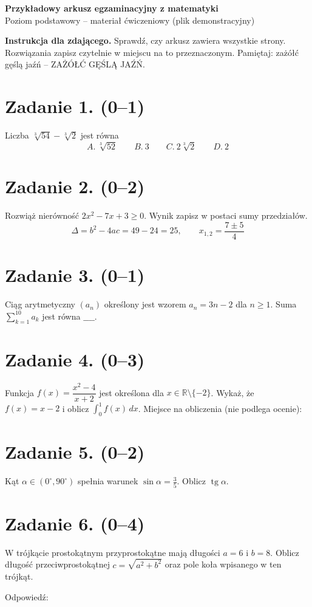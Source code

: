 \documentclass[a4paper,11pt]{article}
\begin{document}
\begin{center}
{\Large\bfseries Przykładowy arkusz egzaminacyjny z matematyki}\\[4pt]
Poziom podstawowy -- materiał ćwiczeniowy (plik demonstracyjny)
\end{center}
\noindent\textbf{Instrukcja dla zdającego.} Sprawdź, czy arkusz zawiera wszystkie strony.
Rozwiązania zapisz czytelnie w miejscu na to przeznaczonym. Pamiętaj: zażółć gęślą jaźń --
ZAŻÓŁĆ GĘŚLĄ JAŹŃ.

\section*{Zadanie 1. (0--1)}
Liczba $\sqrt[3]{54}-\sqrt[3]{2}$ jest równa
\[
A.\ \sqrt[3]{52}\qquad B.\ 3\qquad C.\ 2\sqrt[3]{2}\qquad D.\ 2
\]
\section*{Zadanie 2. (0--2)}
Rozwiąż nierówność $2x^2-7x+3\geq 0$. Wynik zapisz w postaci sumy przedziałów.
\[
\Delta=b^2-4ac=49-24=25,\qquad x_{1,2}=\frac{7\pm 5}{4}
\]
\section*{Zadanie 3. (0--1)}
Ciąg arytmetyczny $(a_n)$ określony jest wzorem $a_n=3n-2$ dla $n\geq1$.
Suma $\displaystyle\sum_{k=1}^{10} a_k$ jest równa $\_\_\_\_$.
\section*{Zadanie 4. (0--3)}
Funkcja $f(x)=\dfrac{x^2-4}{x+2}$ jest określona dla $x\in\mathbb{R}\setminus\{-2\}$.
Wykaż, że $f(x)=x-2$ i oblicz $\int_0^1 f(x)\,dx$.
\vfill
\noindent Miejsce na obliczenia (nie podlega ocenie): \hrulefill
\newpage
\section*{Zadanie 5. (0--2)}
Kąt $\alpha\in(0^\circ,90^\circ)$ spełnia warunek $\sin\alpha=\tfrac{3}{5}$. Oblicz $\operatorname{tg}\alpha$.
\section*{Zadanie 6. (0--4)}
W trójkącie prostokątnym przyprostokątne mają długości $a=6$ i $b=8$.
Oblicz długość przeciwprostokątnej $c=\sqrt{a^2+b^2}$ oraz pole koła wpisanego w ten trójkąt.

\vspace{2cm}
\noindent Odpowiedź: \hrulefill
\end{document}
